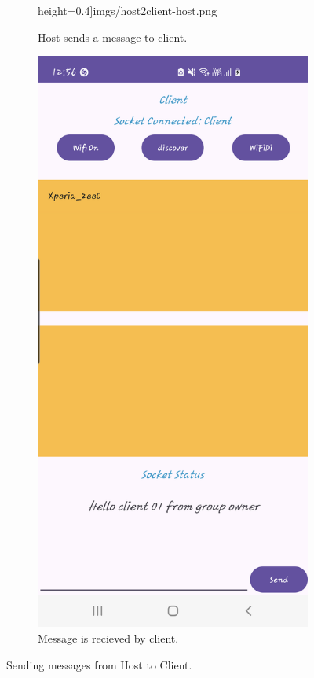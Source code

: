 \begin{figure}
\begin{subfigure}[b]{0.3\textwidth}
            height=0.4\textheight]{imgs/host2client-host.png}
        \caption{Host sends a message to client.}
        \label{hostComm:h}
    \end{subfigure}
    \hspace{1cm}
    \begin{subfigure}[b]{0.3\textwidth}
        \includegraphics[width=\textwidth,
            height=0.4\textheight]{imgs/host2client-client.png}
        \caption{Message is recieved by client.}
        \label{hostComm:c}
    \end{subfigure}
    \caption{Sending messages from Host to Client.}
    \label{hostComm}
\end{figure}

